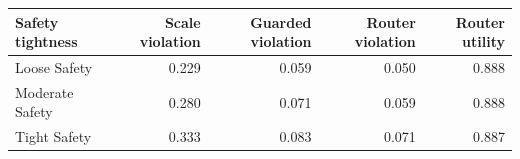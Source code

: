 \begin{tabular}{lrrrr}
\toprule
Safety tightness & Scale violation & Guarded violation & Router violation & Router utility \\
\midrule
Loose Safety & 0.229 & 0.059 & 0.050 & 0.888 \\
Moderate Safety & 0.280 & 0.071 & 0.059 & 0.888 \\
Tight Safety & 0.333 & 0.083 & 0.071 & 0.887 \\
\bottomrule
\end{tabular}
